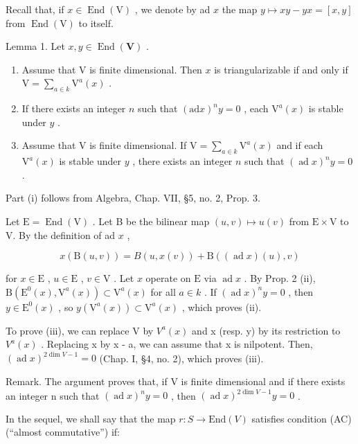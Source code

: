 Recall that, if \(x \in \operatorname{End}(\mathrm{V})\) , we denote by ad \(x\) the map \(y \mapsto xy - yx = [x, y]\) from \(\operatorname{End}(\mathrm{V})\) to itself.

Lemma 1. Let \(x, y \in \operatorname{End}(\mathbf{V})\) .

\begin{enumerate}
\def\labelenumi{(\roman{enumi})}
\item
  Assume that \(\mathrm{V}\) is finite dimensional. Then \(x\) is triangularizable if and only if \(\mathrm{V} = \sum_{a\in k}\mathrm{V}^a (x)\) .
\item
  If there exists an integer \(n\) such that \((\mathrm{ad}x)^n y = 0\) , each \(\mathrm{V}^a(x)\) is stable under \(y\) .
\item
  Assume that \(\mathrm{V}\) is finite dimensional. If \(\mathrm{V} = \sum_{a \in k} \mathrm{V}^a(x)\) and if each \(\mathrm{V}^a(x)\) is stable under \(y\) , there exists an integer \(n\) such that \((\operatorname{ad} x)^n y = 0\) .
\end{enumerate}

Part (i) follows from Algebra, Chap. VII, §5, no. 2, Prop. 3.

Let \(\mathrm{E} = \operatorname{End}(\mathrm{V})\) . Let B be the bilinear map \((u, v) \mapsto u(v)\) from \(\mathrm{E} \times \mathrm{V}\) to V. By the definition of ad \(x\) ,

\[
x (\mathrm{B} (u, v)) = B (u, x (v)) + \mathrm{B} ((\operatorname{ad} x) (u), v)
\]

for \(x \in \mathrm{E}\) , \(u \in \mathrm{E}\) , \(v \in \mathrm{V}\) . Let \(x\) operate on \(\mathrm{E}\) via \(\operatorname{ad} x\) . By Prop. 2 (ii), \(\mathrm{B}(\mathrm{E}^0(x), \mathrm{V}^a(x)) \subset \mathrm{V}^a(x)\) for all \(a \in k\) . If \((\operatorname{ad} x)^n y = 0\) , then \(y \in \mathrm{E}^0(x)\) , so \(y(\mathrm{V}^a(x)) \subset \mathrm{V}^a(x)\) , which proves (ii).

To prove (iii), we can replace V by \(V^{a}(x)\) and x (resp. y) by its restriction to \(V^{a}(x)\) . Replacing x by x - a, we can assume that x is nilpotent. Then, \((\operatorname{ad} x)^{2\dim V-1} = 0\) (Chap. I, §4, no. 2), which proves (iii).

Remark. The argument proves that, if V is finite dimensional and if there exists an integer n such that \((\operatorname{ad} x)^{n}y = 0\) , then \((\operatorname{ad} x)^{2\dim V-1}y = 0\) .

In the sequel, we shall say that the map \(r : S \to \text{End}(V)\) satisfies condition (AC) (``almost commutative'') if:

